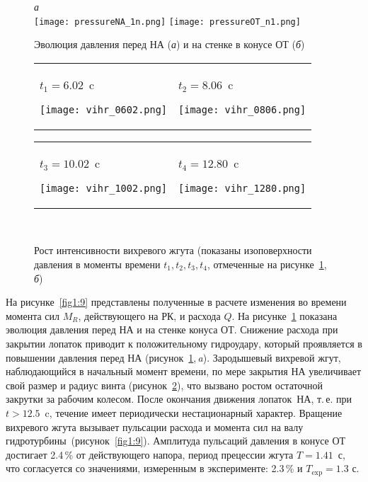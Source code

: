 \begin{figure}[ht]
  \label{fig1:10}
  \centering\small{\it а}\hspace*{78mm}{\it б}\\
  {\texttt{[image: pressureNA\_1n.png]}}\hfill
  {\texttt{[image: pressureOT\_n1.png]}}
  \caption{Эволюция давления перед НА (\emph{а}) и на стенке в конусе ОТ (\emph{б})}
\end{figure}

\begin{figure}[t!]
  \label{fig1:11}
  \centering\small
  \begin{tabular}{p{}p{}}
  \centering\small $t_1=6.02$~c
  \par \texttt{[image: vihr\_0602.png]}&
  \centering $t_2=8.06$~c \par
  \texttt{[image: vihr\_0806.png]}
  \end{tabular}\vspace*{5mm}
  \begin{tabular}{p{}p{}}
  \centering $t_3=10.02$~c \par
  \texttt{[image: vihr\_1002.png]}&
  \centering $t_4=12.80$~c \par
  \texttt{[image: vihr\_1280.png]}
  \end{tabular}\\[3mm]
  \caption{Рост интенсивности вихревого жгута (показаны изоповерхности давления в моменты 
           времени $t_1, t_2, t_3, t_4$, отмеченные на рисунке~\ref{fig1:10}, \emph{б})}
\end{figure}

На рисунке~\ref{fig1:9} представлены полученные в расчете изменения во времени момента сил $M_R$, 
действующего на РК, и расхода $Q$. На рисунке~\ref{fig1:10} показана эволюция давления перед НА 
и на стенке конуса ОТ. 
Снижение расхода при закрытии лопаток приводит к положительному гидроудару, который проявляется в повышении 
давления перед НА (рисунок~\ref{fig1:10},\,\emph{a}). Зародышевый вихревой жгут, наблюдающийся в начальный 
момент времени, по мере закрытия НА увеличивает свой размер и радиус винта (рисунок~\ref{fig1:11}), что 
вызвано ростом остаточной закрутки за рабочим колесом. 
После окончания движения лопаток~НА, т.\,е. при $t>12.5$~c, течение имеет периодически 
нестационарный характер. Вращение вихревого жгута вызывает пульсации расхода и момента сил на
валу гидротурбины~(рисунок~\ref{fig1:9}). Амплитуда пульсаций давления в конусе ОТ достигает 2.4\,\% от 
действующего напора, период прецессии жгута $T=1.41$~с, что согласуется со значениями, измеренным в 
эксперименте: 2.3\,\% и $T_{\text{exp}}=1.3$ с.

